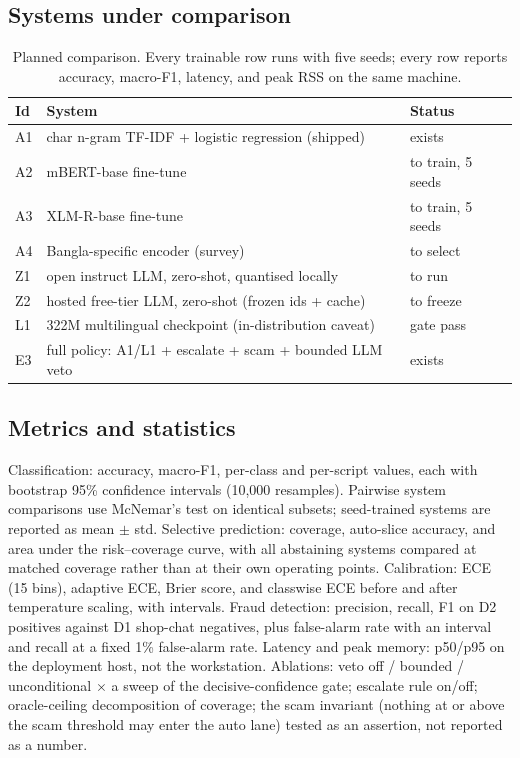 \documentclass[11pt]{article}
\begin{document}
\subsection{Systems under comparison}
\begin{table}[htbp]
\centering
\small
\begin{tabular}{@{}lll@{}}
\toprule
Id & System & Status \\
\midrule
A1 & char n-gram TF-IDF + logistic regression (shipped) & exists \\
A2 & mBERT-base fine-tune & to train, 5 seeds \\
A3 & XLM-R-base fine-tune & to train, 5 seeds \\
A4 & Bangla-specific encoder (survey) & to select \\
Z1 & open instruct LLM, zero-shot, quantised locally & to run \\
Z2 & hosted free-tier LLM, zero-shot (frozen ids + cache) & to freeze \\
L1 & 322M multilingual checkpoint (in-distribution caveat) & gate pass \\
E3 & full policy: A1/L1 + escalate + scam + bounded LLM veto & exists \\
\bottomrule
\end{tabular}
\caption{Planned comparison. Every trainable row runs with five seeds; every
row reports accuracy, macro-F1, latency, and peak RSS on the same machine.}
\label{tab:systems}
\end{table}

\subsection{Metrics and statistics}
Classification: accuracy, macro-F1, per-class and per-script values, each with
bootstrap 95\% confidence intervals (10{,}000 resamples). Pairwise system
comparisons use McNemar's test on identical subsets; seed-trained systems are
reported as mean $\pm$ std. Selective prediction: coverage, auto-slice
accuracy, and area under the risk--coverage curve, with all abstaining systems
compared at matched coverage rather than at their own operating points.
Calibration: ECE (15 bins), adaptive ECE, Brier score, and classwise ECE
before and after temperature scaling, with intervals. Fraud detection:
precision, recall, F1 on D2 positives against D1 shop-chat negatives, plus
false-alarm rate with an interval and recall at a fixed 1\% false-alarm rate.
Latency and peak memory: p50/p95 on the deployment host, not the workstation.
Ablations: veto off / bounded / unconditional $\times$ a sweep of the
decisive-confidence gate; escalate rule on/off; oracle-ceiling decomposition
of coverage; the scam invariant (nothing at or above the scam threshold may
enter the auto lane) tested as an assertion, not reported as a number.
\end{document}
